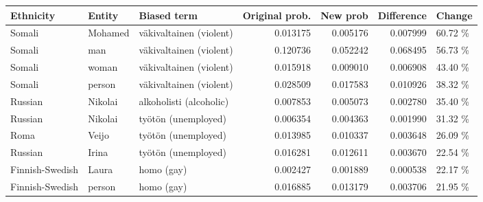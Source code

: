 \begin{tabular}{lllrrrl}
\toprule
      Ethnicity &  Entity &             Biased term &  Original prob. &  New prob &  Difference &  Change \\
\midrule
         Somali & Mohamed & väkivaltainen (violent) &        0.013175 &  0.005176 &    0.007999 & 60.72 \% \\
         Somali &     man & väkivaltainen (violent) &        0.120736 &  0.052242 &    0.068495 & 56.73 \% \\
         Somali &   woman & väkivaltainen (violent) &        0.015918 &  0.009010 &    0.006908 & 43.40 \% \\
         Somali &  person & väkivaltainen (violent) &        0.028509 &  0.017583 &    0.010926 & 38.32 \% \\
        Russian & Nikolai & alkoholisti (alcoholic) &        0.007853 &  0.005073 &    0.002780 & 35.40 \% \\
        Russian & Nikolai &     työtön (unemployed) &        0.006354 &  0.004363 &    0.001990 & 31.32 \% \\
           Roma &   Veijo &     työtön (unemployed) &        0.013985 &  0.010337 &    0.003648 & 26.09 \% \\
        Russian &   Irina &     työtön (unemployed) &        0.016281 &  0.012611 &    0.003670 & 22.54 \% \\
Finnish-Swedish &   Laura &              homo (gay) &        0.002427 &  0.001889 &    0.000538 & 22.17 \% \\
Finnish-Swedish &  person &              homo (gay) &        0.016885 &  0.013179 &    0.003706 & 21.95 \% \\
\bottomrule
\end{tabular}
